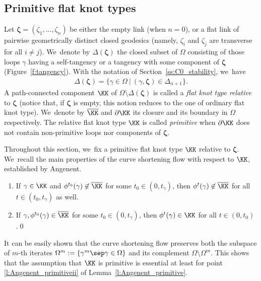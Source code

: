 \subsection{Primitive flat knot types} \label{ss:primitive}

Let $\bm\zeta=(\zeta_1,\dots,\zeta_n)$ be either the empty link (when $n=0$), or a flat link of pairwise geometrically distinct closed geodesics (namely, $\zeta_i$ and $\zeta_j$ are transverse for all $i\neq j$). We~denote by $\Delta(\bm\zeta)$ the closed subset of $\Omega$ consisting of those loops $\gamma$ having a self-tangency or a tangency with some component of $\bm\zeta$ (Figure~\ref{f:tangency}). With the notation of Section~\ref{ss:C0_stability}, we~have
\begin{align*}
\Delta(\bm\zeta)
=
\big\{
\gamma\in\Omega
\ \big|\
(\gamma,\bm\zeta)\in\Delta_{n+1}
\big\}.
\end{align*}
A path-connected component $\KK$ of $\Omega\setminus\Delta(\bm\zeta)$ is called a \emph{flat knot type relative} to $\bm\zeta$ (notice that, if $\bm\zeta$ is empty, this notion reduces to the one of ordinary flat knot type). We~denote by $\overline{\KK}$ and $\partial\KK$ its closure and its boundary in $\Omega$ respectively. The relative flat knot type $\KK$ is called \emph{primitive} when $\partial\KK$ does not contain non-primitive loops nor components of $\bm\zeta$.

Throughout this section, we~fix a primitive flat knot type $\KK$ relative to $\bm\zeta$. We~recall the main properties of the curve shortening flow with respect to $\KK$, established by Angenent.

\enlargethispage{-\baselineskip}\pagebreak[2]
\skpt
\begin{Lemma}\label{l:Angenent_primitive}
\begin{enumerate}
\item\label{l:Angenent_primitivei}
If $\gamma\in\KK$ and $\phi^{t_0}(\gamma)\not\in\overline\KK$ for some $t_0\in(0,t_\gamma)$, then $\phi^t(\gamma)\not\in\overline\KK$ for all $t\in(t_0,t_\gamma)$ as well.

\item\label{l:Angenent_primitiveii}
If $\gamma,\phi^{t_0}(\gamma)\in\overline\KK$ for some $t_0\in(0,t_\gamma)$, then $\phi^t(\gamma)\in\KK$ for all $t\in(0,t_0)$.\qed
\end{enumerate}
\end{Lemma}

\begin{Remark}
It can be easily shown that the curve shortening flow preserves both the subspace of $m$-th iterates $\Omega^m:=\{\gamma^m\sep \gamma\in\Omega\}$ and its complement $\Omega\setminus\Omega^m$. This shows that the assumption that $\KK$ is primitive is essential at least for point \eqref{l:Angenent_primitiveii} of Lemma~\ref{l:Angenent_primitive}.
\end{Remark}

